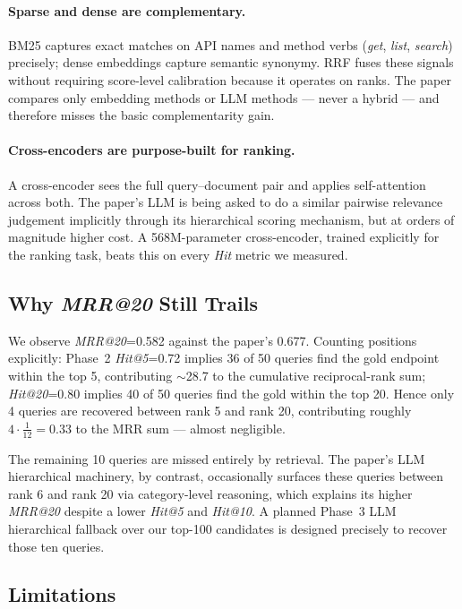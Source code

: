 \documentclass[10pt,a4paper,twocolumn]{article}
\begin{document}
\paragraph{Sparse and dense are complementary.} BM25 captures exact
matches on API names and method verbs (\emph{get}, \emph{list},
\emph{search}) precisely; dense embeddings capture semantic
synonymy. RRF fuses these signals without requiring score-level
calibration because it operates on ranks. The paper compares only
embedding methods or LLM methods --- never a hybrid --- and
therefore misses the basic complementarity gain.

\paragraph{Cross-encoders are purpose-built for ranking.} A
cross-encoder sees the full query--document pair and applies
self-attention across both. The paper's LLM is being asked to do a
similar pairwise relevance judgement implicitly through its
hierarchical scoring mechanism, but at orders of magnitude higher
cost. A 568M-parameter cross-encoder, trained explicitly for the
ranking task, beats this on every \emph{Hit} metric we measured.

\subsection{Why \emph{MRR@20} Still Trails}

We observe \emph{MRR@20}=0.582 against the paper's 0.677. Counting
positions explicitly: Phase~2 \emph{Hit@5}=0.72 implies 36 of 50
queries find the gold endpoint within the top 5, contributing
$\sim$28.7 to the cumulative reciprocal-rank sum;
\emph{Hit@20}=0.80 implies 40 of 50 queries find the gold within the
top 20. Hence only 4 queries are recovered between rank 5 and rank
20, contributing roughly $4 \cdot \tfrac{1}{12} = 0.33$ to the MRR
sum --- almost negligible.

The remaining 10 queries are missed entirely by retrieval. The
paper's LLM hierarchical machinery, by contrast, occasionally
surfaces these queries between rank 6 and rank 20 via category-level
reasoning, which explains its higher \emph{MRR@20} despite a lower
\emph{Hit@5} and \emph{Hit@10}. A planned Phase~3 LLM hierarchical
fallback over our top-100 candidates is designed precisely to
recover those ten queries.

\subsection{Limitations}
\end{document}
